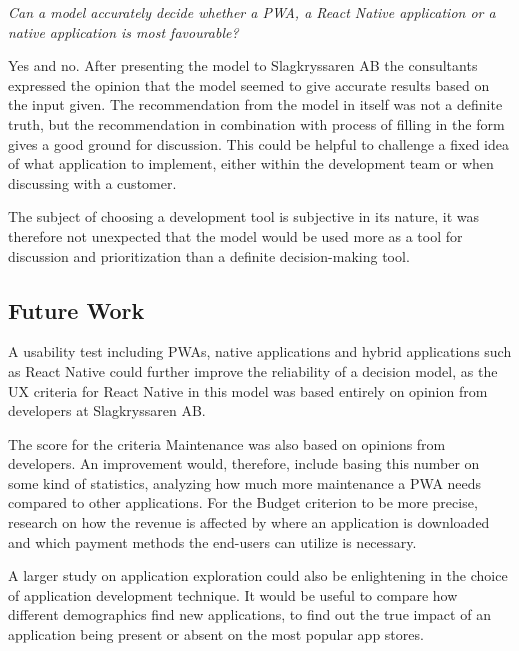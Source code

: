 \textit{Can a model accurately decide whether a PWA, a React Native application or a native application is most favourable?}

Yes and no. After presenting the model to Slagkryssaren AB the consultants expressed the opinion that the model seemed to give accurate results based on the input given. The recommendation from the model in itself was not a definite truth, but the recommendation in combination with process of filling in the form gives a good ground for discussion. This could be helpful to challenge a fixed idea of what application to implement, either within the development team or when discussing with a customer.

The subject of choosing a development tool is subjective in its nature, it was therefore not unexpected that the model would be used more as a tool for discussion and prioritization than a definite decision-making tool.

\subsection{Future Work}

A usability test including PWAs, native applications and hybrid applications such as React Native could further improve the reliability of a decision model, as the UX criteria for React Native in this model was based entirely on opinion from developers at Slagkryssaren AB.

The score for the criteria Maintenance was also based on opinions from developers. An improvement would, therefore, include basing this number on some kind of statistics, analyzing how much more maintenance a PWA needs compared to other applications. For the Budget criterion to be more precise, research on how the revenue is affected by where an application is downloaded and which payment methods the end-users can utilize is necessary.

A larger study on application exploration could also be enlightening in the choice of application development technique. It would be useful to compare how different demographics find new applications, to find out the true impact of an application being present or absent on the most popular app stores.
